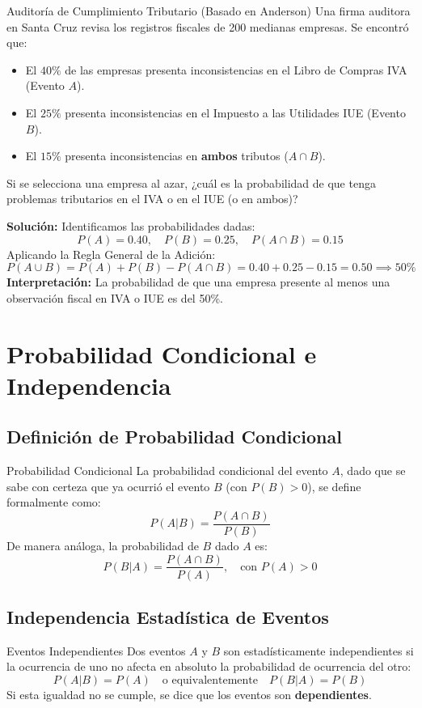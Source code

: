 \begin{ejemplo}{Auditoría de Cumplimiento Tributario (Basado en Anderson)}
Una firma auditora en Santa Cruz revisa los registros fiscales de 200 medianas empresas. Se encontró que:
\begin{itemize}
    \item El $40\%$ de las empresas presenta inconsistencias en el Libro de Compras IVA (Evento $A$).
    \item El $25\%$ presenta inconsistencias en el Impuesto a las Utilidades IUE (Evento $B$).
    \item El $15\%$ presenta inconsistencias en \textbf{ambos} tributos ($A \cap B$).
\end{itemize}
Si se selecciona una empresa al azar, ¿cuál es la probabilidad de que tenga problemas tributarios en el IVA o en el IUE (o en ambos)?

\tcbline
\textbf{Solución:}
Identificamos las probabilidades dadas:
\[
P(A) = 0.40, \quad P(B) = 0.25, \quad P(A \cap B) = 0.15
\]
Aplicando la Regla General de la Adición:
\[
P(A \cup B) = P(A) + P(B) - P(A \cap B) = 0.40 + 0.25 - 0.15 = 0.50 \implies 50\%
\]
\textbf{Interpretación:} La probabilidad de que una empresa presente al menos una observación fiscal en IVA o IUE es del 50\%.
\end{ejemplo}

\section{Probabilidad Condicional e Independencia}

\subsection{Definición de Probabilidad Condicional}
\begin{definicion}{Probabilidad Condicional}
La probabilidad condicional del evento $A$, dado que se sabe con certeza que ya ocurrió el evento $B$ (con $P(B) > 0$), se define formalmente como:
\begin{equation}
    P(A|B) = \frac{P(A \cap B)}{P(B)}
\end{equation}
De manera análoga, la probabilidad de $B$ dado $A$ es:
\begin{equation}
    P(B|A) = \frac{P(A \cap B)}{P(A)}, \quad \text{con } P(A) > 0
\end{equation}
\end{definicion}

\subsection{Independencia Estadística de Eventos}
\begin{definicion}{Eventos Independientes}
Dos eventos $A$ y $B$ son estadísticamente independientes si la ocurrencia de uno no afecta en absoluto la probabilidad de ocurrencia del otro:
\begin{equation}
    P(A|B) = P(A) \quad \text{o equivalentemente} \quad P(B|A) = P(B)
\end{equation}
Si esta igualdad no se cumple, se dice que los eventos son \textbf{dependientes}.
\end{definicion}


